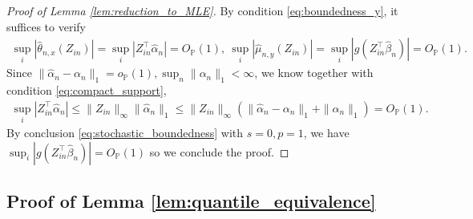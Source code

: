 \documentclass[12pt]{article}
\theoremstyle{definition}
\def\P{\mathbb{P}}
\def\P{\mathbb{P}}
\renewcommand{\P}{\mathbb{P}}							%
\newcommand{\srz}{Z}									%
\begin{document}
\begin{proof}[Proof of Lemma \ref{lem:reduction_to_MLE}]
    By condition \eqref{eq:boundedness_y}, it suffices to verify 
    \begin{align*}
      \sup_{i}|\widehat{\theta}_{n,x}(\srz_{in})|=\sup_{i}|\srz_{in}^\top\widehat{\alpha}_{n}|=O_{\P}(1),\ \sup_{i}|\widehat{\mu}_{n,y}(\srz_{in})|=\sup_{i}|g(\srz_{in}^\top\widehat{\beta}_n)|=O_{\P}(1).
    \end{align*}
    Since $\|\widehat{\alpha}_n-\alpha_n\|_1=o_{\P}(1),\sup_{n}\|\alpha_n\|_1<\infty$, we know together with condition \eqref{eq:compact_support},
    \begin{align*}
      \sup_i |\srz_{in}^\top \widehat{\alpha}_n|\leq \|\srz_{in}\|_{\infty}\|\widehat\alpha_n\|_1\leq \|\srz_{in}\|_{\infty}(\|\widehat\alpha_n-\alpha_n\|_1+\|\alpha_n\|_1)=O_{\P}(1).
    \end{align*}
    By conclusion \eqref{eq:stochastic_boundedness} with $s=0,p=1$, we have $\sup_{i}|g(\srz_{in}^\top\widehat{\beta}_n)|=O_{\P}(1)$ so we conclude the proof.
    


    
\end{proof}



  \subsection{Proof of Lemma \ref{lem:quantile_equivalence}}
  
\end{document}
